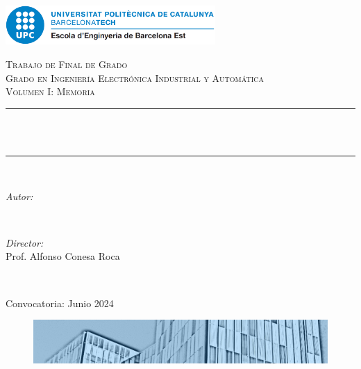 \begin{titlepage}


\newcommand{\HRule}{\rule{\linewidth}{0.5mm}} %

\centering
\includegraphics[width=8cm]{fig/eebe.png}\\[1cm] 
 
\center 

\textsc{\LARGE Trabajo de Final de Grado}\\[1.5cm] 
\textsc{\large Grado en Ingeniería Electrónica Industrial y Automática}\\[0.5cm] 
\textsc{\Large Volumen I: Memoria}\\[0.5cm] 

\makeatletter
\HRule \\[0.4cm]
{ \huge \bfseries \@title}\\[0.4cm] %
\HRule \\[1.5cm]
 

\begin{minipage}{0.4\textwidth}
\begin{flushleft} \large
\emph{Autor:}\\
\@author 


\end{flushleft}
\end{minipage}
~
\begin{minipage}{0.4\textwidth}
\begin{flushright} \large
\emph{Director:} \\
Prof. Alfonso Conesa Roca \\[1.2em] 
\end{flushright}
\end{minipage}\\[2cm]
\makeatother


{\large Convocatoria: Junio 2024}\\[2cm]

\begin{figure}[H]
\centering
  \includegraphics[width=15cm]{fig/portada-uni.png}
\end{figure}
\end{titlepage}

\vfill %
